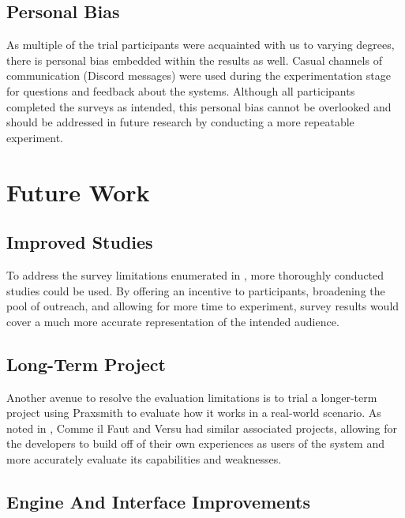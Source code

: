 \subsection{Personal Bias} \label{sec:PersonalBias}

As multiple of the trial participants were acquainted with us to varying
degrees, there is personal bias embedded within the results as well. Casual channels
of communication (Discord messages) were used during the experimentation stage for
questions and feedback about the systems. Although all participants completed the
surveys as intended, this personal bias cannot be overlooked and should be addressed
in future research by conducting a more repeatable experiment.

\section{Future Work} \label{sec:FutureWork}

\subsection{Improved Studies} \label{sec:ImprovedStudies}

To address the survey limitations enumerated in , more thoroughly
conducted studies could be used. By offering an incentive to participants, broadening the
pool of outreach, and allowing for more time to experiment, survey results would cover
a much more accurate representation of the intended audience.

\subsection{Long-Term Project} \label{sec:LongTermProject}

Another avenue to resolve the evaluation limitations is to trial a longer-term project
using Praxsmith to evaluate how it works in a real-world scenario. As noted in ,
Comme il Faut \cite{mccoy_social_2014} and Versu \cite{nelson_prompter_2014} had similar
associated projects, allowing for the developers to build off of their own experiences
as users of the system and more accurately evaluate its capabilities and weaknesses.

\subsection{Engine And Interface Improvements} \label{sec:EngineAndInterfaceImprovements}

